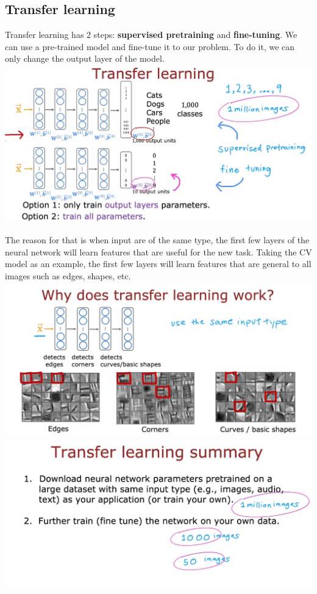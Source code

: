 \subsection*{Transfer learning}
Transfer learning has 2 steps: \textbf{supervised pretraining} and \textbf{fine-tuning}.
We can use a pre-trained model and fine-tune it to our problem. To do it, we can only change the output layer of the model.\\
\includegraphics*[width=\textwidth]{images/10.24}
\par
The reason for that is when input are of the same type, the first few layers of the neural network will learn features that are useful for the new task.
Taking the CV model as an example, the first few layers will learn features that are general to all images such as edges, shapes, etc.
\\
\includegraphics*[width=\textwidth]{images/10.25}
\includegraphics*[width=\textwidth]{images/10.26}
